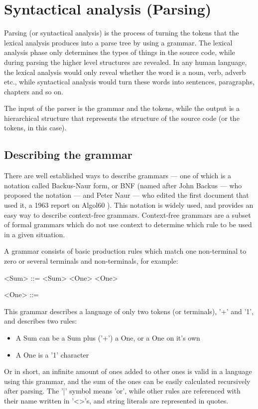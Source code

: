 \chapter{Syntactical analysis (Parsing)}
Parsing (or syntactical analysis) is the process of turning the tokens that the lexical analysis produces into a parse tree by using a grammar. The lexical analysis phase only determines the types of things in the source code, while during parsing the higher level structures are revealed. In any human language, the lexical analysis would only reveal whether the word is a noun, verb, adverb etc., while syntactical analysis would turn these words into sentences, paragraphs, chapters and so on.

The input of the parser is the grammar and the tokens, while the output is a hierarchical structure that represents the structure of the source code (or the tokens, in this case).
\section{Describing the grammar}
There are well established ways to describe grammars --- one of which is a notation called Backus-Naur form, or BNF (named after John Backus --- who proposed the notation --- and Peter Naur --- who edited the first document that used it, a 1963 report on Algol60 \cite{backus1963revised}). This notation is widely used, and provides an easy way to describe context-free grammars. Context-free grammars are a subset of formal grammars which do not use context to determine which rule to be used in a given situation.

A grammar consists of basic production rules which match one non-terminal to zero or several terminals and non-terminals, for example:
\begin{grammar}
<Sum> ::= <Sum> \lit{+} <One>
    \alt <One> 

<One> ::= 
\end{grammar}

This grammar describes a language of only two tokens (or terminals), '+' and '1', and describes two rules:
\begin{itemize}
\item A Sum can be a Sum plus ('+') a One, or a One on it's own
\item A One is a '1' character
\end{itemize}
Or in short, an infinite amount of ones added to other ones is valid in a language using this grammar, and the sum of the ones can be easily calculated recursively after parsing. The '|' symbol means 'or', while other rules are referenced with their name written in '<>'s, and string literals are represented in quotes.


